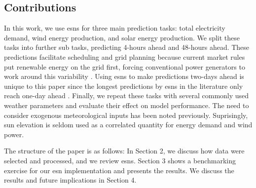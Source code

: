 \subsection{Contributions}
In this work, we use \glspl{esn} for three main prediction tasks: total
electricity demand, wind energy production, and solar energy production. We
split these tasks into further sub tasks, predicting 4-hours ahead and 48-hours
ahead. These predictions facilitate scheduling and grid planning
because current market rules put renewable energy on the grid first, forcing
conventional power generators to work around this variability
\cite{wang_quantifying_2016}. Using \glspl{esn} to make predictions two-days
ahead is unique to this paper since the longest predictions by \glspl{esn} in
the literature only reach one-day ahead \cite{deihimi_application_2012}.
Finally, we repeat these tasks with several commonly used weather parameters
and evaluate their effect on model performance. The need to consider exogenous
meteorological inputs has been noted previously. Suprisingly, sun elevation is
seldom used as a correlated quantity for energy demand and wind power.

The structure of the paper is as follows: In Section 2, we discuss how data
were selected and processed, and we review \glspl{esn}. Section 3 shows a
benchmarking
exercise for our \gls{esn} implementation and presents the results. We discuss
the results and future implications in Section 4.

